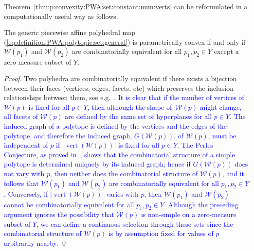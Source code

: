 \documentclass[smallextended]{svjour3}       %
\numberwithin{equation}{section}
\DeclareMathOperator{\vertices}{vert}
\DeclareMathOperator*{\conv}{conv}
\newcommand{\revision}[1]{\textcolor{blue}{#1}}
\begin{document}
%
Theorem~\ref{thm:p:convexity:PWA:set:constant:num:verts} can be reformulated in a computationally useful way as follows.
%
\begin{corollary}\label{thm:combinatorical:equivalence:alternative}
The generic piecewise affine polyhedral map (\ref{eq:definition:PWA:polytopic:set:general})
is parametrically convex if and only if $\mathcal W(p_1)$ and $\mathcal W(p_2)$ are combinatorially equivalent for all $p_1,p_2\in Y$ except a zero measure subset of $Y$.
\end{corollary}
%
\begin{proof}
Two polyhedra are combinatorially equivalent if there exists a bijection between their faces (vertices, edges, facets, etc) which preserves the inclusion relationships between them, see e.g.~\cite{Ziegler:1995}.
%
\revision{It is clear that if the number of vertices of $\mathcal W(p)$ is fixed for all $p\in Y$, then although the shape of~$\mathcal W(p)$ might change, all facets of $\mathcal W(p)$ are defined by the same set of hyperplanes for all $p\in Y$.
%
The induced graph of a polytope is defined by the vertices and the edges of the polytope, and therefore the induced graph, $G(\mathcal W(p))$, of $\mathcal W(p)$, must be independent of $p$ if $\lvert\vertices(\mathcal W(p))\rvert$ is fixed for all $p\in Y$.
%
The Perles Conjecture, as proved in~\cite{Kalai:1988}, shows that the combinatorial structure of a simple polytope is determined uniquely by its induced graph; hence if $G(\mathcal W(p))$ does not vary with $p$, then neither does the combinatorial structure of $\mathcal W(p)$, and it follows that $\mathcal W(p_1)$ and $\mathcal W(p_2)$ are combinatorially equivalent for all $p_1,p_2\in Y$. Conversely, if $\lvert\vertices(\mathcal W(p))\rvert$ varies with $p$, then $\mathcal W(p_1)$ and $\mathcal W(p_2)$ cannot be combinatorially equivalent for all $p_1,p_2\in Y$.
%
%
Although the preceding argument ignores the possibility that $\mathcal W(p)$ is non-simple on a zero-measure subset of $Y$, we can define a continuous selection through these sets since the combinatorial structure of $\mathcal W(p)$ is by assumption fixed for values of $p$ arbitrarily nearby.}
%
\qed
\end{proof}
\end{document}
